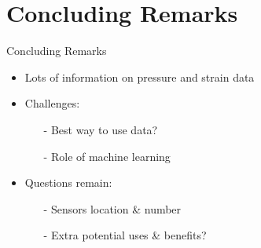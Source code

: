 \documentclass[aspectratio=169]{beamer}            %
\begin{document}
\section{Concluding Remarks}
\begin{frame}{Concluding Remarks}

  \pause
  \begin{itemize}[<+->]
    \item{Lots of information on pressure and strain data}
    \item{Challenges:}
		\begin{itemize}[<+->]
		  \item[-]{Best way to use data?}
			\item[-]{Role of machine learning}
		\end{itemize}
		\item{Questions remain:}
		\begin{itemize}[<+->]
		  \item[-]{Sensors location \& number}
			\item[-]{Extra potential uses \& benefits?}
		\end{itemize}
  \end{itemize}
	  
\end{frame}
\end{document}
